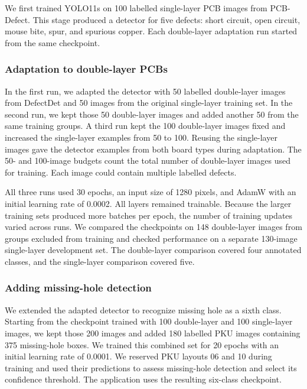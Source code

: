 \documentclass[conference]{IEEEtran}
\begin{document}
We first trained YOLO11s on 100 labelled single-layer PCB images from PCB-Defect. This stage produced a detector for five defects: short circuit, open circuit, mouse bite, spur, and spurious copper. Each double-layer adaptation run started from the same checkpoint.

\subsubsection{Adaptation to double-layer PCBs}

In the first run, we adapted the detector with 50 labelled double-layer images from DefectDet and 50 images from the original single-layer training set. In the second run, we kept those 50 double-layer images and added another 50 from the same training groups. A third run kept the 100 double-layer images fixed and increased the single-layer examples from 50 to 100. Reusing the single-layer images gave the detector examples from both board types during adaptation. The 50- and 100-image budgets count the total number of double-layer images used for training. Each image could contain multiple labelled defects.

All three runs used 30 epochs, an input size of 1280 pixels, and AdamW with an initial learning rate of 0.0002. All layers remained trainable. Because the larger training sets produced more batches per epoch, the number of training updates varied across runs. We compared the checkpoints on 148 double-layer images from groups excluded from training and checked performance on a separate 130-image single-layer development set. The double-layer comparison covered four annotated classes, and the single-layer comparison covered five.

\subsubsection{Adding missing-hole detection}

We extended the adapted detector to recognize missing hole as a sixth class. Starting from the checkpoint trained with 100 double-layer and 100 single-layer images, we kept those 200 images and added 180 labelled PKU images containing 375 missing-hole boxes. We trained this combined set for 20 epochs with an initial learning rate of 0.0001. We reserved PKU layouts 06 and 10 during training and used their predictions to assess missing-hole detection and select its confidence threshold. The application uses the resulting six-class checkpoint.
\end{document}

